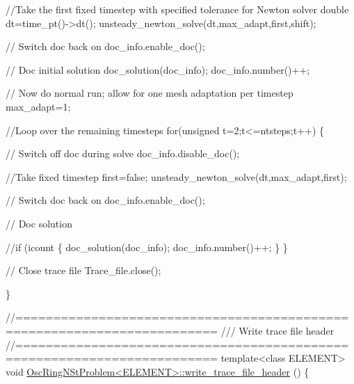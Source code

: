 \begin{DoxyCodeInclude}
{{{{{{ \textcolor{comment}{//Take the first fixed timestep with specified tolerance for Newton solver}
 \textcolor{keywordtype}{double} dt=time\_pt()->dt();
 unsteady\_newton\_solve(dt,max\_adapt,first,shift);

 \textcolor{comment}{// Switch doc back on}
 doc\_info.enable\_doc();

 \textcolor{comment}{// Doc initial solution}
 doc\_solution(doc\_info);
 doc\_info.number()++;

 \textcolor{comment}{// Now do normal run; allow for one mesh adaptation per timestep}
 max\_adapt=1; 

 \textcolor{comment}{//Loop over the remaining timesteps}
 \textcolor{keywordflow}{for}(\textcolor{keywordtype}{unsigned} t=2;t<=ntsteps;t++)
  \{

   \textcolor{comment}{// Switch off doc during solve}
   doc\_info.disable\_doc();

   \textcolor{comment}{//Take fixed timestep}
   first=\textcolor{keyword}{false};
   unsteady\_newton\_solve(dt,max\_adapt,first);

   \textcolor{comment}{// Switch doc back on}
   doc\_info.enable\_doc();

   \textcolor{comment}{// Doc solution}
   \textcolor{comment}{//if (icount%
    \{
     doc\_solution(doc\_info);
     doc\_info.number()++;
    \}
  \}

 \textcolor{comment}{// Close trace file}
 Trace\_file.close();

\}




\textcolor{comment}{//========================================================================}\textcolor{comment}{}
\textcolor{comment}{/// Write trace file header}
\textcolor{comment}{}\textcolor{comment}{//========================================================================}
\textcolor{keyword}{template}<\textcolor{keyword}{class} ELEMENT>
\textcolor{keywordtype}{void} \hyperlink{classOscRingNStProblem_a96e12e5bb761d765ebe9065b9990112f}{OscRingNStProblem<ELEMENT>::write\_trace\_file\_header}
      ()
\{

}}}}}}}
\end{DoxyCodeInclude}
